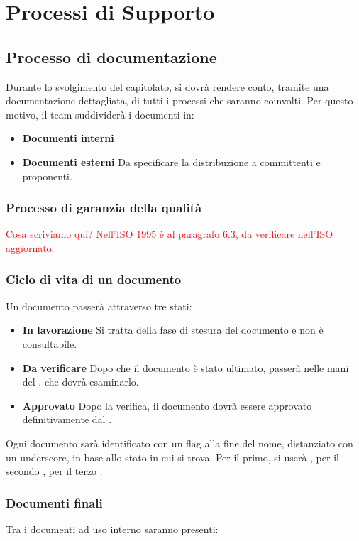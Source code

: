 \newpage
\section{Processi di Supporto}
\subsection{Processo di documentazione}
Durante lo svolgimento del capitolato, si dovrà rendere conto, tramite una documentazione dettagliata, di tutti i processi che saranno coinvolti. Per questo motivo, il team suddividerà i documenti in:
\begin{itemize}
	\item \textbf{Documenti interni}
	\item \textbf{Documenti esterni}
	Da specificare la distribuzione a committenti e proponenti.
\end{itemize}
\subsubsection{Processo di garanzia della qualità}
\textcolor{red}{Cosa scriviamo qui? Nell'ISO 1995 è al paragrafo 6.3, da verificare nell'ISO aggiornato.}

\subsubsection{Ciclo di vita di un documento}
Un documento passerà attraverso tre stati:
\begin{itemize}
	\item \textbf{In lavorazione}
	Si tratta della fase di stesura del documento e non è consultabile.
	\item \textbf{Da verificare}
	Dopo che il documento è stato ultimato, passerà nelle mani del \ver, che dovrà esaminarlo.
	\item \textbf{Approvato}
	Dopo la verifica, il documento dovrà essere approvato definitivamente dal \RdP.
\end{itemize}
Ogni documento sarà identificato con un flag alla fine del nome, distanziato con un underscore, in base allo stato in cui si trova. Per il primo, si userà \emph{}, per il secondo \emph{}, per il terzo \emph{}.

\subsubsection{Documenti finali}
Tra i documenti ad uso interno saranno presenti:
